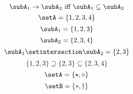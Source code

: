 {\begin{forslides}
\begin{equation}
			\label{eq:prod-slides-15}
			\subA_1 \to \subA_2 \text{ iff } \subA_1 \subseteq \subA_2
		\end{equation}
		\begin{equation}
			\label{eq:prod-slides-16}
			\setA = \{ 1, 2, 3, 4 \}
		\end{equation}
		\begin{equation}
			\label{eq:prod-slides-17}
			\subA_1 = \{ 1, 2, 3 \}
		\end{equation}
		\begin{equation}
			\label{eq:prod-slides-18}
			\subA_2 = \{2, 3, 4 \}
		\end{equation}
		\begin{equation}
			\label{eq:prod-slides-19}
			\subA_1 \setintersection \subA_2 = \{2, 3 \}
		\end{equation}
		\begin{equation}
			\label{eq:prod-slides-20}
			\{ 1, 2, 3 \} \supseteq \{2, 3 \} \subseteq \{2, 3, 4 \}
		\end{equation}
		\begin{equation}
			\label{eq:coprod-slides-1}
			\setA=\{\star, \diamond\}
		\end{equation}
		\begin{equation}
			\label{eq:coprod-slides-2}
			\setB=\{\ast, \dagger\}
		\end{equation}
	\end{forslides}
}


